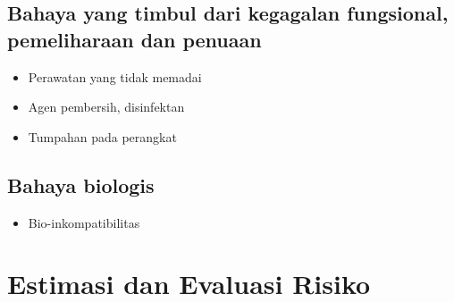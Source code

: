 \documentclass[11pt,a4paper,twoside,draft,onecolumn]{book}
\begin{document}
			\subsection{Bahaya yang timbul dari kegagalan fungsional, pemeliharaan dan penuaan}
			\begin{itemize}
				\item Perawatan yang tidak memadai
				\item Agen pembersih, disinfektan
				\item Tumpahan pada perangkat
			\end{itemize}
			
			\subsection{Bahaya biologis}
			\begin{itemize}
				\item Bio-inkompatibilitas
			\end{itemize}
			
		\section{Estimasi dan Evaluasi Risiko}
	\newpage
	
	
\end{document}
